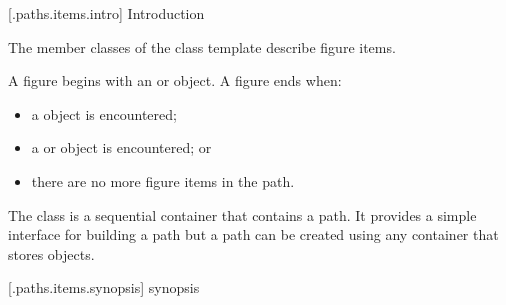 
 [\iotwod.paths.items.intro] {Introduction}

\pnum
The member classes of the class template  describe figure items.

\pnum
A figure begins with an  or  object. A figure ends when:

\begin{itemize}
\item a  object is encountered;
\item a  or  object is encountered; or
\item there are no more figure items in the path.
\end{itemize}

\pnum
The  class is a sequential container that contains a path. It provides a simple interface for building a path but a path can be created using any container that stores  objects.

 [\iotwod.paths.items.synopsis] { synopsis}

